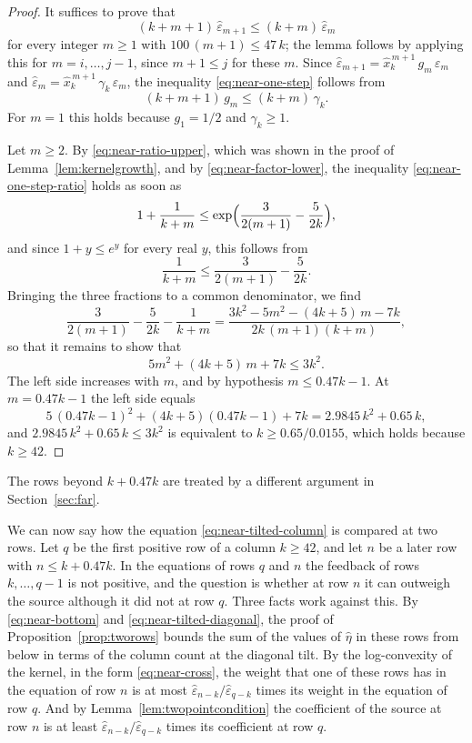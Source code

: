 \documentclass{amsart}
\makeatletter
\theoremstyle{definition}
\theoremstyle{remark}
\numberwithin{equation}{section}
\def\subsection{\@startsection{subsection}{2}\z@{.5\linespacing\@plus.7\linespacing}{-.5em}{\normalfont\bfseries\boldmath}}
\makeatother
\begin{document}
\begin{proof}
It suffices to prove that
\begin{equation}\label{eq:near-one-step}
(k+m+1)\,\hat\varepsilon_{m+1}\le(k+m)\,\hat\varepsilon_m
\end{equation}
for every integer $m\ge1$ with $100\,(m+1)\le47\,k$; the lemma follows by
applying this for $m=i,\dots,j-1$, since $m+1\le j$ for these $m$. Since
$\hat\varepsilon_{m+1}=\hat x_k^{\,m+1}\,g_m\,\varepsilon_m$ and
$\hat\varepsilon_m=\hat x_k^{\,m+1}\,\gamma_k\,\varepsilon_m$, the inequality
\eqref{eq:near-one-step} follows from
\begin{equation}\label{eq:near-one-step-ratio}
(k+m+1)\,g_m\le(k+m)\,\gamma_k .
\end{equation}
For $m=1$ this holds because $g_1=1/2$ and $\gamma_k\ge1$.

Let $m\ge2$. By \eqref{eq:near-ratio-upper}, which was shown in the proof of
Lemma~\ref{lem:kernelgrowth}, and by
\eqref{eq:near-factor-lower}, the inequality \eqref{eq:near-one-step-ratio}
holds as soon as
\[
1+\frac{1}{k+m}\le\exp\Bigl(\frac{3}{2(m+1)}-\frac{5}{2k}\Bigr),
\]
and since $1+y\le e^y$ for every real $y$, this follows from
\[
\frac{1}{k+m}\le\frac{3}{2(m+1)}-\frac{5}{2k} .
\]
Bringing the three fractions to a common denominator, we find
\[
\frac{3}{2(m+1)}-\frac{5}{2k}-\frac{1}{k+m}
=\frac{3k^2-5m^2-(4k+5)\,m-7k}{2k\,(m+1)(k+m)} ,
\]
so that it remains to show that
\[
5m^2+(4k+5)\,m+7k\le3k^2 .
\]
The left side increases with $m$, and by hypothesis $m\le0.47k-1$. At
$m=0.47k-1$ the left side equals
\[
5\,(0.47k-1)^2+(4k+5)(0.47k-1)+7k=2.9845\,k^2+0.65\,k ,
\]
and $2.9845\,k^2+0.65\,k\le3k^2$ is equivalent to
$k\ge0.65/0.0155$, which holds because $k\ge42$.
\end{proof}

The rows beyond $k+0.47k$ are treated by a different argument in
Section~\ref{sec:far}.

\subsection{The comparison at two rows}\label{subsec:near-abstract}

We can now say how the equation \eqref{eq:near-tilted-column} is compared at
two rows. Let $q$ be the first positive row of a column $k\ge42$, and let
$n$ be a later row with $n\le k+0.47k$. In the equations of rows $q$ and $n$
the feedback of rows $k,\dots,q-1$ is not positive, and the question is
whether at row $n$ it can outweigh the source although it did not at row
$q$. Three facts work against this. By \eqref{eq:near-bottom} and
\eqref{eq:near-tilted-diagonal}, the proof of Proposition~\ref{prop:tworows}
bounds the sum of the values of $\hat\eta$ in these rows from below in terms
of the column count at the diagonal tilt. By the log-convexity of the kernel, in the form
\eqref{eq:near-cross},
the weight that one of these rows has in the equation of row $n$ is at
most $\hat\varepsilon_{n-k}/\hat\varepsilon_{q-k}$ times its weight in the
equation of row $q$. And by Lemma~\ref{lem:twopointcondition} the
coefficient of the source at row $n$ is at least
$\hat\varepsilon_{n-k}/\hat\varepsilon_{q-k}$ times its coefficient at row
$q$.
\end{document}
